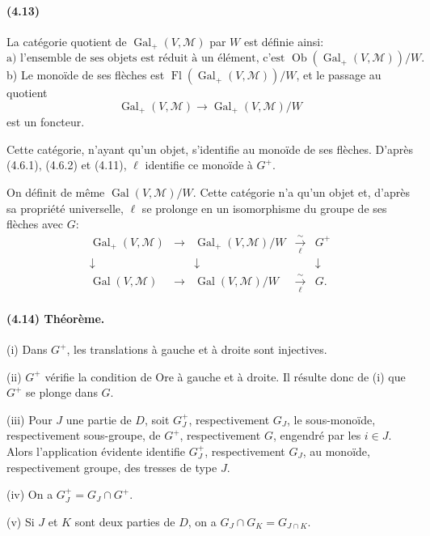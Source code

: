 \documentclass[10pt]{article}
\begin{document}
\paragraph{(4.13)} La catégorie quotient de \(\operatorname{Gal}_+(V,\mathcal M)\) par \(W\) est définie ainsi:
\[
\text{a) l'ensemble de ses objets est réduit à un élément, c'est }
\operatorname{Ob}(\operatorname{Gal}_+(V,\mathcal M))/W.
\]
b) Le monoïde de ses flèches est \(\operatorname{Fl}(\operatorname{Gal}_+(V,\mathcal M))/W\), et le passage au quotient
\[
\operatorname{Gal}_+(V,\mathcal M)\longrightarrow
\operatorname{Gal}_+(V,\mathcal M)/W
\]
est un foncteur.

Cette catégorie, n'ayant qu'un objet, s'identifie au monoïde de ses flèches. D'après (4.6.1), (4.6.2) et (4.11), \(\ell\) identifie ce monoïde à \(G^+\).

On définit de même \(\operatorname{Gal}(V,\mathcal M)/W\). Cette catégorie n'a qu'un objet et, d'après sa propriété universelle, \(\ell\) se prolonge en un isomorphisme du groupe de ses flèches avec \(G\):
\[
\begin{array}{ccccc}
\operatorname{Gal}_+(V,\mathcal M)&\longrightarrow&
\operatorname{Gal}_+(V,\mathcal M)/W&\xrightarrow[\ell]{\sim}&G^+\\
\downarrow&&\downarrow&&\downarrow\\
\operatorname{Gal}(V,\mathcal M)&\longrightarrow&
\operatorname{Gal}(V,\mathcal M)/W&\xrightarrow[\ell]{\sim}&G .
\end{array}
\]

\paragraph{(4.14) Théorème.} (i) Dans \(G^+\), les translations à gauche et à droite sont injectives.

(ii) \(G^+\) vérifie la condition de Ore à gauche et à droite. Il résulte donc de (i) que \(G^+\) se plonge dans \(G\).

(iii) Pour \(J\) une partie de \(D\), soit \(G_J^+\), respectivement \(G_J\), le sous-monoïde, respectivement sous-groupe, de \(G^+\), respectivement \(G\), engendré par les \(i\in J\). Alors l'application évidente identifie \(G_J^+\), respectivement \(G_J\), au monoïde, respectivement groupe, des tresses de type \(J\).

(iv) On a \(G_J^+=G_J\cap G^+\).

(v) Si \(J\) et \(K\) sont deux parties de \(D\), on a \(G_J\cap G_K=G_{J\cap K}\).
\end{document}
